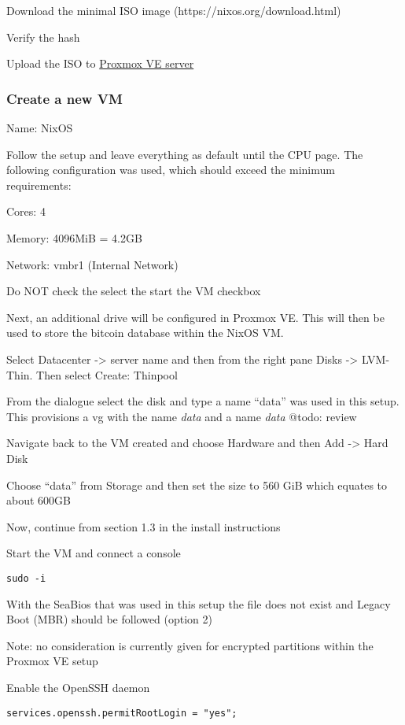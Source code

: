 Download the minimal ISO image (https://nixos.org/download.html)

Verify the hash

Upload the ISO to
\protect\hyperlink{ux5cux23ux5cux23Upload-the-ISO-image-to-the-Proxmox-VE-server}{Proxmox
VE server}

\hypertarget{create-a-new-vm}{%
\subsubsection{Create a new VM}\label{create-a-new-vm}}

Name: NixOS

Follow the setup and leave everything as default until the CPU page. The
following configuration was used, which should exceed the minimum
requirements:

Cores: 4

Memory: 4096MiB = 4.2GB

Network: vmbr1 (Internal Network)

Do NOT check the select the start the VM checkbox

Next, an additional drive will be configured in Proxmox VE. This will
then be used to store the bitcoin database within the NixOS VM.

Select Datacenter -\textgreater{} server name and then from the right
pane Disks -\textgreater{} LVM-Thin. Then select Create: Thinpool

From the dialogue select the disk and type a name ``data'' was used in
this setup. This provisions a vg with the name \emph{data} and a name
\emph{data} @todo: review

Navigate back to the VM created and choose Hardware and then Add
-\textgreater{} Hard Disk

Choose ``data'' from Storage and then set the size to 560 GiB which
equates to about 600GB

Now, continue from section 1.3 in the install instructions

Start the VM and connect a console

\texttt{sudo\ -i}

With the SeaBios that was used in this setup the file does not exist and
Legacy Boot (MBR) should be followed (option 2)

Note: no consideration is currently given for encrypted partitions
within the Proxmox VE setup

Enable the OpenSSH daemon

\begin{verbatim}
services.openssh.permitRootLogin = "yes";
\end{verbatim}

